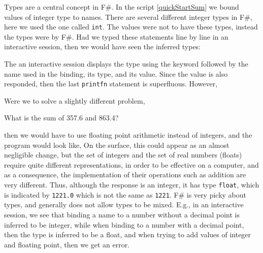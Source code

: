 Types are a central concept in F\#. In the script \ref{quickStartSum} we bound values of integer type to names. There are several different integer types in F\#, here we used the one called \lstinline|int|. The values were not  to have these types, instead the types were  by F\#. Had we typed these statements line by line in an interactive session, then we would have seen the inferred types:
%
\begin{comment}
$ fsharpi

F# Interactive for F# 4.0 (Open Source Edition)
Freely distributed under the Apache 2.0 Open Source License

For help type #help;;

\end{comment}
%
%
\begin{comment}
  $
\end{comment}
%
%
%
\begin{comment}

> #quit;;
\end{comment}
%
The an interactive session displays the type using the  keyword followed by the name used in the binding, its type, and its value. Since the value is also responded, then the last \lstinline|printfn| statement is superfluous. However, 

Were we to solve a slightly different problem,
%
\begin{problem}
  What is the sum of 357.6 and 863.4?
\end{problem}
%
then we would have to use floating point arithmetic instead of integers, and the program would look like,
%
%
On the surface, this could appear as an almost negligible change, but the set of integers and the set of real numbers (floats) require quite different representations, in order to be effective on a computer, and as a consequence, the implementation of their operations such as addition are very different. Thus, although the response is an integer, it has type \lstinline|float|, which is indicated by \lstinline|1221.0| which is not the same as \lstinline|1221|. F\# is very picky about types, and generally does not allow types to be mixed. E.g., in an interactive session,
%
%
we see that binding a name to a number without a decimal point is inferred to be integer, while when binding to a number with a decimal point, then the type is inferred to be a float, and when trying to add values of integer and floating point, then we get an error.

